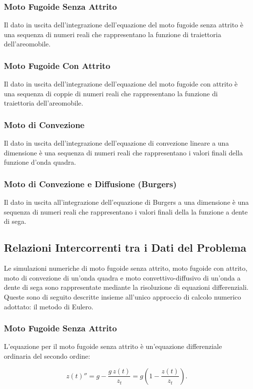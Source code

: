 \subsubsection*{Moto Fugoide Senza Attrito}
Il dato in uscita dell'integrazione dell'equazione del moto fugoide senza attrito è una sequenza di numeri reali che rappresentano la funzione di traiettoria dell'areomobile.
\subsubsection*{Moto Fugoide Con Attrito}
Il dato in uscita dell'integrazione dell'equazione del moto fugoide con attrito è una sequenza di coppie di numeri reali che rappresentano la funzione di traiettoria dell'areomobile.
\subsubsection*{Moto di Convezione}
Il dato in uscita dell'integrazione dell'equazione di convezione lineare a una dimensione è una sequenza di numeri reali che rappresentano i valori finali della funzione d'onda quadra.
\subsubsection*{Moto di Convezione e Diffusione (Burgers)}
Il dato in uscita all'integrazione dell'equazione di Burgers a una dimensione è una sequenza di numeri reali che rappresentano i valori finali della la funzione a dente di sega.

\subsection{Relazioni Intercorrenti tra i Dati del Problema}\label{analisi}
Le simulazioni numeriche di moto fugoide senza attrito, moto fugoide con attrito, moto di convezione di un'onda quadra e moto convettivo-diffusivo di un'onda a dente di sega sono rappresentate mediante la risoluzione di equazioni differenziali. Queste sono di seguito descritte insieme all'unico approccio di calcolo numerico adottato: il metodo di Eulero. 

\subsubsection*{Moto Fugoide Senza Attrito}
L’equazione per il moto fugoide senza attrito è un’equazione differenziale ordinaria del secondo ordine:

\begin{equation}
z(t)'' = g - \frac{g \,z(t)}{z_t} = g \left(1 - \frac{z(t)}{z_t}\right).
\end{equation}

